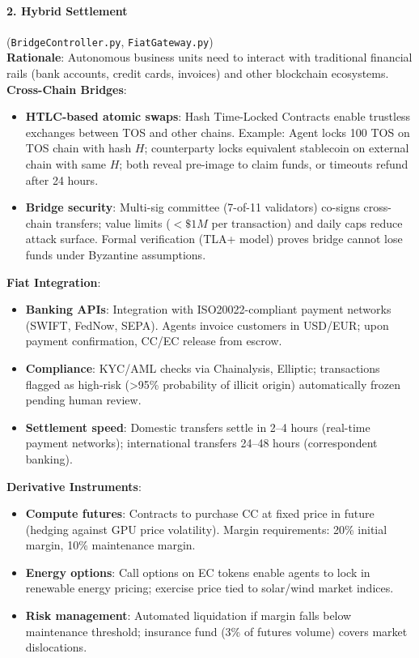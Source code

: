 \documentclass[11pt]{article}
\begin{document}
\paragraph{2. Hybrid Settlement} (\texttt{BridgeController.py}, \texttt{FiatGateway.py})\\
\textbf{Rationale}: Autonomous business units need to interact with traditional financial rails (bank accounts, credit cards, invoices) and other blockchain ecosystems.\\
\textbf{Cross-Chain Bridges}:
\begin{itemize}[noitemsep]
  \item \textbf{HTLC-based atomic swaps}: Hash Time-Locked Contracts enable trustless exchanges between TOS and other chains. Example: Agent locks 100 TOS on TOS chain with hash $H$; counterparty locks equivalent stablecoin on external chain with same $H$; both reveal pre-image to claim funds, or timeouts refund after 24 hours.
  \item \textbf{Bridge security}: Multi-sig committee (7-of-11 validators) co-signs cross-chain transfers; value limits ($<\$1M$ per transaction) and daily caps reduce attack surface. Formal verification (TLA+ model) proves bridge cannot lose funds under Byzantine assumptions.
\end{itemize}
\textbf{Fiat Integration}:
\begin{itemize}[noitemsep]
  \item \textbf{Banking APIs}: Integration with ISO20022-compliant payment networks (SWIFT, FedNow, SEPA). Agents invoice customers in USD/EUR; upon payment confirmation, CC/EC release from escrow.
  \item \textbf{Compliance}: KYC/AML checks via Chainalysis, Elliptic; transactions flagged as high-risk (>95\% probability of illicit origin) automatically frozen pending human review.
  \item \textbf{Settlement speed}: Domestic transfers settle in 2--4 hours (real-time payment networks); international transfers 24--48 hours (correspondent banking).
\end{itemize}
\textbf{Derivative Instruments}:
\begin{itemize}[noitemsep]
  \item \textbf{Compute futures}: Contracts to purchase CC at fixed price in future (hedging against GPU price volatility). Margin requirements: 20\% initial margin, 10\% maintenance margin.
  \item \textbf{Energy options}: Call options on EC tokens enable agents to lock in renewable energy pricing; exercise price tied to solar/wind market indices.
  \item \textbf{Risk management}: Automated liquidation if margin falls below maintenance threshold; insurance fund (3\% of futures volume) covers market dislocations.
\end{itemize}
\end{document}
